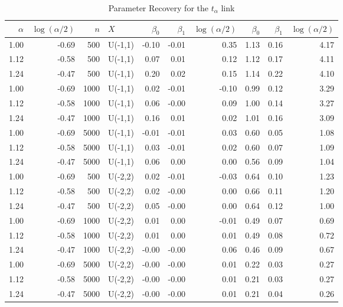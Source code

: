 \begin{table}[ht]
\begin{center}
\caption{Parameter Recovery for the $t_\alpha$ link}
\label{talphatable}
\begin{tabular}{rrrlrrrrrr}
  \toprule
$\alpha$ & $\log(\alpha/2)$ & $n$ & $X$ & $  \beta_0$ &   $\beta_1$ &   $\log(\alpha/2)$ & $   \beta_0$ &    $\beta_1$ &    $\log(\alpha/2)$ \\ 
  \midrule
1.00 & -0.69 & 500 & U(-1,1) & -0.10 & -0.01 & 0.35 & 1.13 & 0.16 & 4.17 \\ 
  1.12 & -0.58 & 500 & U(-1,1) & 0.07 & 0.01 & 0.12 & 1.12 & 0.17 & 4.11 \\ 
  1.24 & -0.47 & 500 & U(-1,1) & 0.20 & 0.02 & 0.15 & 1.14 & 0.22 & 4.10 \\ 
  1.00 & -0.69 & 1000 & U(-1,1) & 0.02 & -0.01 & -0.10 & 0.99 & 0.12 & 3.29 \\ 
  1.12 & -0.58 & 1000 & U(-1,1) & 0.06 & -0.00 & 0.09 & 1.00 & 0.14 & 3.27 \\ 
  1.24 & -0.47 & 1000 & U(-1,1) & 0.16 & 0.01 & 0.02 & 1.01 & 0.16 & 3.09 \\ 
  1.00 & -0.69 & 5000 & U(-1,1) & -0.01 & -0.01 & 0.03 & 0.60 & 0.05 & 1.08 \\ 
  1.12 & -0.58 & 5000 & U(-1,1) & 0.03 & -0.01 & 0.02 & 0.60 & 0.07 & 1.09 \\ 
  1.24 & -0.47 & 5000 & U(-1,1) & 0.06 & 0.00 & 0.00 & 0.56 & 0.09 & 1.04 \\ 
  1.00 & -0.69 & 500 & U(-2,2) & 0.02 & -0.01 & -0.03 & 0.64 & 0.10 & 1.23 \\ 
  1.12 & -0.58 & 500 & U(-2,2) & 0.02 & -0.00 & 0.00 & 0.66 & 0.11 & 1.20 \\ 
  1.24 & -0.47 & 500 & U(-2,2) & 0.05 & -0.00 & 0.00 & 0.64 & 0.12 & 1.00 \\ 
  1.00 & -0.69 & 1000 & U(-2,2) & 0.01 & 0.00 & -0.01 & 0.49 & 0.07 & 0.69 \\ 
  1.12 & -0.58 & 1000 & U(-2,2) & 0.01 & 0.00 & 0.01 & 0.49 & 0.08 & 0.72 \\ 
  1.24 & -0.47 & 1000 & U(-2,2) & -0.00 & -0.00 & 0.06 & 0.46 & 0.09 & 0.67 \\ 
  1.00 & -0.69 & 5000 & U(-2,2) & -0.00 & -0.00 & 0.01 & 0.22 & 0.03 & 0.27 \\ 
  1.12 & -0.58 & 5000 & U(-2,2) & -0.00 & -0.00 & 0.01 & 0.21 & 0.03 & 0.27 \\ 
  1.24 & -0.47 & 5000 & U(-2,2) & -0.00 & -0.00 & 0.01 & 0.21 & 0.04 & 0.26 \\ 
   \bottomrule
\end{tabular}
\end{center}
\end{table}
